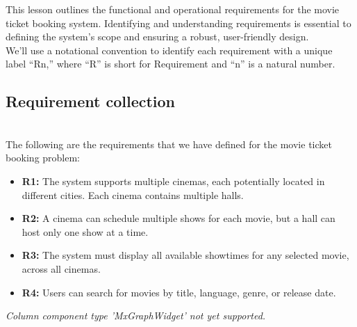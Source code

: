 

This lesson outlines the functional and operational requirements for the movie ticket booking system. Identifying and understanding requirements is essential to defining the system's scope and ensuring a robust, user-friendly design.
\\
We'll use a notational convention to identify each requirement with a unique label ``Rn,'' where ``R'' is short for Requirement and ``n'' is a natural number.

\subsection{Requirement collection}\label{XcuN9vWFsQ7z96nm7hk0s}
\\
The following are the requirements that we have defined for the movie ticket booking problem:

\noindent
\begin{minipage}[t]{0.48\textwidth}\vspace{0pt}
\begin{itemize}
\item
\textbf{R1:} The system supports multiple cinemas, each potentially located in different cities. Each cinema contains multiple halls.
\item
\textbf{R2:} A cinema can schedule multiple shows for each movie, but a hall can host only one show at a time.
\item
\textbf{R3:} The system must display all available showtimes for any selected movie, across all cinemas.
\item
\textbf{R4:} Users can search for movies by title, language, genre, or release date.
\end{itemize}
\end{minipage}
\hfill
\begin{minipage}[t]{0.48\textwidth}\vspace{0pt}
\textit{Column component type 'MxGraphWidget' not yet supported.}
\end{minipage}

